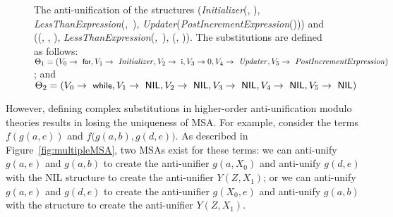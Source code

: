\begin{figure}[t]
\centering{}
\caption{The anti-unification of the structures (\textit{Initializer}(, ), \mbox{\textit{LessThanExpression}(, ),} \textit{Updater}(\textit{PostIncrementExpression}())) and (\NIL{}(\NIL{}, \NIL{}, \NIL{}), \mbox{\textit{LessThanExpression}(, ),} \NIL{}(\NIL{}, \NIL{})). The substitutions are defined as follows: $\Theta_1 = (V_0 \rightarrow \text{ \textsf{\small for}}, V_1 \rightarrow \text{ \textit{Initializer}}, V_2 \rightarrow \text{ \textsf{\small i}}, V_3 \rightarrow 0, V_4 \rightarrow \text{ \textit{Updater}}, V_5 \rightarrow \text{ \textit{PostIncrementExpression}})$; and $\Theta_2 = (V_0 \rightarrow \text{ \textsf{\small while}}, V_1 \rightarrow \text{ \textsf{NIL}}, V_2 \rightarrow \text{ \textsf{NIL}}, V_3 \rightarrow \text{ \textsf{NIL}}, V_4 \rightarrow \text{ \textsf{NIL}}, V_5 \rightarrow \text{ \textsf{NIL}})$\label{fig:for-while}}
\end{figure}

However, defining complex substitutions in higher-order anti-unification modulo theories results in losing the uniqueness of MSA. For example, consider the terms $f(g(a,e))$ and $f(g(a,b),$\linebreak$g(d,e))$. As described in Figure~\ref{fig:multipleMSA}, two MSAs exist for these terms: we can anti-unify $g(a,e)$ and $g(a,b)$ to create the anti-unifier $g(a,X_0)$ and anti-unify $g(d,e)$ with the NIL structure to create the anti-unifier $Y(Z,X_1)$; or we can anti-unify $g(a,e)$ and $g(d,e)$ to create the anti-unifier $g(X_0,e)$ and anti-unify $g(a,b)$ with the \NIL{} structure to create the anti-unifier $Y(Z,X_1)$.

